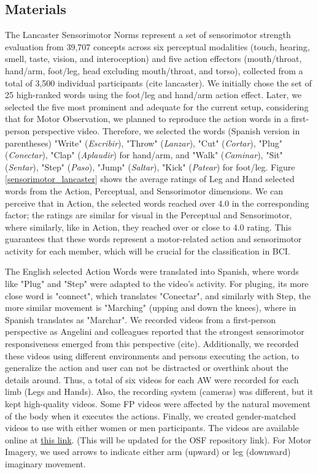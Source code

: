 \documentclass[10pt,letterpaper]{article}
\begin{document}
\subsection{Materials}

The Lancaster Sensorimotor Norms represent a set of sensorimotor strength evaluation from 39,707 concepts across six perceptual modalities (touch, hearing, smell, taste, vision, and interoception) and five action effectors (mouth/throat, hand/arm, foot/leg, head excluding mouth/throat, and torso), collected from a total of 3,500 individual participants (cite lancaster). We initially chose the set of 25 high-ranked words using the foot/leg and hand/arm action effect. Later, we selected the five most prominent and adequate for the current setup, considering that for Motor Observation, we planned to reproduce the action words in a first-person perspective video. Therefore, we selected the words (Spanish version in parentheses)  "Write" (\textit{Escribir}), "Throw" (\textit{Lanzar}), "Cut" (\textit{Cortar}), "Plug" (\textit{Conectar}), "Clap" (\textit{Aplaudir}) for hand/arm, and  "Walk" (\textit{Caminar}), "Sit" (\textit{Sentar}), "Step" (\textit{Paso}), "Jump" (\textit{Saltar}), "Kick" (\textit{Patear}) for foot/leg. Figure \ref{sensorimotor_lancaster} shows the average ratings of Leg and Hand selected words from the Action, Perceptual, and Sensorimotor dimensions. We can perceive that in Action, the selected words reached over 4.0 in the corresponding factor; the ratings are similar for visual in the Perceptual and Sensorimotor, where similarly, like in Action, they reached over or close to 4.0 rating. This guarantees that these words represent a motor-related action and sensorimotor activity for each member, which will be crucial for the classification in BCI. 

The English selected Action Words were translated into Spanish, where words like "Plug" and "Step" were adapted to the video's activity. For pluging, its more close word is "connect", which translates "Conectar", and similarly with Step, the more similar movement is "Marching" (upping and down the knees), where in Spanish translates as "Marchar".  We recorded videos from a first-person perspective as Angelini and colleagues reported that the strongest sensorimotor responsiveness emerged from this perspective (cite). Additionally, we recorded these videos using different environments and persons executing the action, to generalize the action and user can not be distracted or overthink about the details around. Thus, a total of six videos for each AW were recorded for each limb (Legs and Hands). Also, the recording system (cameras) was different, but it kept high-quality videos. Some FP videos were affected by the natural movement of the body when it executes the actions. Finally, we created gender-matched videos to use with either women or men participants. The videos are available online at \href{https://drive.google.com/drive/folders/1tBw2gumuGx_a9fdr_oX_tJngc04v0xCf}{this link}. (This will be updated for the OSF repository link). For Motor Imagery, we used arrows to indicate either arm (upward) or leg (downward) imaginary movement.
\end{document}
